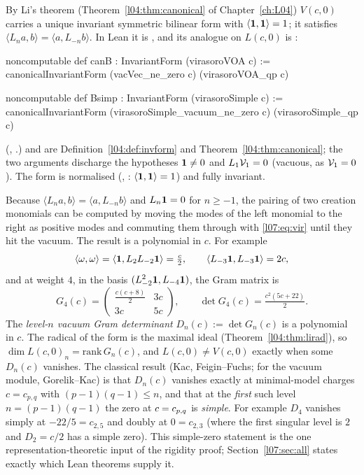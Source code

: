 By Li's theorem (Theorem~\ref{l04:thm:canonical} of Chapter~\ref{ch:L04}) $V(c,0)$ carries a unique
invariant symmetric bilinear form with $\langle\mathbf{1},\mathbf{1}\rangle = 1$; it satisfies
$\langle L_na,b\rangle = \langle a,L_{-n}b\rangle$. In Lean it is , and its
analogue on $L(c,0)$ is :
\begin{leancode}
noncomputable def canB : InvariantForm (virasoroVOA c) :=
  canonicalInvariantForm (vacVec_ne_zero c) (virasoroVOA_qp c)

noncomputable def Bsimp : InvariantForm (virasoroSimple c) :=
  canonicalInvariantForm (virasoroSimple_vacuum_ne_zero c) (virasoroSimple_qp c)
\end{leancode}
(, .)
 and  are Definition~\ref{l04:def:invform} and
Theorem~\ref{l04:thm:canonical}; the two arguments discharge the hypotheses $\mathbf{1}\ne0$ and
$L_1\mathcal{V}_1 = 0$ (vacuous, as $\mathcal{V}_1 = 0$). The form is normalised (,
: $\langle\mathbf{1},\mathbf{1}\rangle = 1$) and fully invariant.

Because $\langle L_na,b\rangle = \langle a,L_{-n}b\rangle$ and $L_n\mathbf{1} = 0$ for $n\ge-1$, the pairing of two
creation monomials can be computed by moving the modes of the left monomial to the right as positive
modes and commuting them through with \eqref{l07:eq:vir} until they hit the vacuum. The result is a
polynomial in $c$. For example
\begin{equation*}
 \langle\omega,\omega\rangle = \langle\mathbf{1},L_2L_{-2}\mathbf{1}\rangle = \tfrac c2,\qquad
 \langle L_{-3}\mathbf{1},L_{-3}\mathbf{1}\rangle = 2c,
\end{equation*}
and at weight $4$, in the basis $(L_{-2}^2\mathbf{1}, L_{-4}\mathbf{1})$, the Gram matrix is
\begin{equation}\label{l07:eq:gram4}
 G_4(c) = \begin{pmatrix} \tfrac{c(c+8)}{2} & 3c\\ 3c & 5c\end{pmatrix},\qquad
 \det G_4(c) = \tfrac{c^2(5c+22)}{2}.
\end{equation}
The \emph{level-$n$ vacuum Gram determinant} $D_n(c) := \det G_n(c)$ is a polynomial in $c$. The
radical of the form is the maximal ideal (Theorem~\ref{l04:thm:lirad}), so
$\dim L(c,0)_n = \mathrm{rank}\,G_n(c)$, and $L(c,0)\ne V(c,0)$ exactly when some $D_n(c)$ vanishes. The
classical result (Kac, Feigin--Fuchs; for the vacuum module, Gorelik--Kac) is that $D_n(c)$ vanishes
exactly at minimal-model charges $c = c_{p,q}$ with $(p-1)(q-1)\le n$, and that at the \emph{first} such
level $n = (p-1)(q-1)$ the zero at $c = c_{p,q}$ is \emph{simple}. For example $D_4$ vanishes simply at
$-22/5 = c_{2,5}$ and doubly at $0 = c_{2,3}$ (where the first singular level is $2$ and $D_2 = c/2$ has a
simple zero). This simple-zero statement is the one representation-theoretic input of the rigidity proof;
Section~\ref{l07:sec:all} states exactly which Lean theorems supply it.

